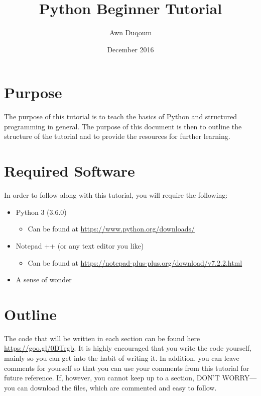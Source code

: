 \documentclass{article}
\title{Python Beginner Tutorial}
\author{Awn Duqoum}
\date{December 2016}
\begin{document}
\maketitle

\section{Purpose}

The purpose of this tutorial is to teach the basics of Python and structured programming in general. The purpose of this document is then to outline the structure of the tutorial and to provide the resources for further learning.


\section{Required Software}


In order to follow along with this tutorial, you will require the following: 

\begin{itemize}
    \item Python 3 (3.6.0)
    \begin{itemize}
        \item Can be found at \url{https://www.python.org/downloads/}
    \end{itemize}
    \item Notepad ++ (or any text editor you like)
        \begin{itemize}
        \item Can be found  at \url{https://notepad-plus-plus.org/download/v7.2.2.html}
        \end{itemize}
    \item A sense of wonder
\end{itemize}

\section{Outline}
The code that will be written in each section can be found here \url{https://goo.gl/0DTrgb}. It is highly encouraged that you write the code yourself, mainly so you can get into the habit of writing it. In addition, you can leave comments for yourself so that you can use your comments from this tutorial for future reference. If, however, you cannot keep up to a section, DON'T WORRY—you can download the files, which are commented and easy to follow. 
\end{document}

